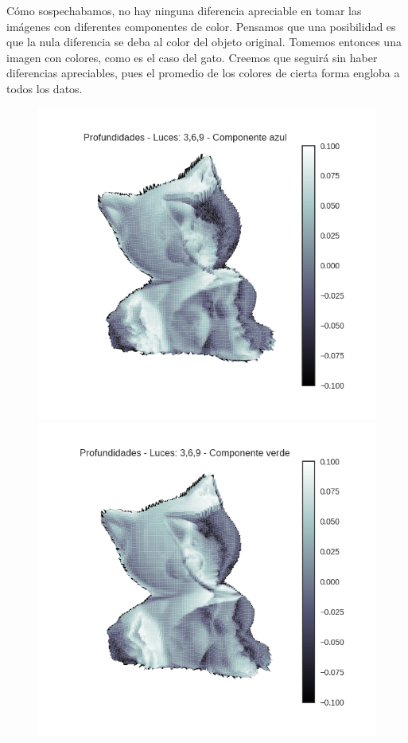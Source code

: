 Cómo sospechabamos, no hay ninguna diferencia apreciable en tomar las imágenes con diferentes componentes de color. Pensamos que una posibilidad es que la nula diferencia se deba al color del objeto original. Tomemos entonces una imagen con colores, como es el caso del gato. Creemos que seguirá sin haber diferencias apreciables, pues el promedio de los colores de cierta forma engloba a todos los datos. \\


\begin{figure}[H]
\centering
\begin{minipage}{.5\textwidth}
  \centering
  \includegraphics[width=1\linewidth]{informe/imagenes/profundidades/gato369Azul.png}
\end{minipage}%
\begin{minipage}{.5\textwidth}
  \centering
    \includegraphics[width=1\linewidth]{informe/imagenes/profundidades/gato369Verde.png}

\end{minipage}
\end{figure}

